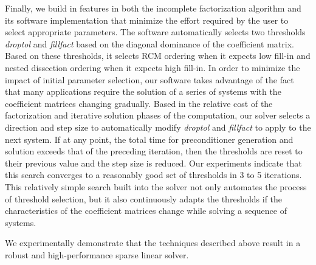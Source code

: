 \documentclass{report}
\begin{document}
Finally, we build in features in both the incomplete factorization
algorithm and its software implementation that minimize the effort
required by the user to select appropriate parameters. The software
automatically selects two thresholds {\em droptol} and {\em fillfact}
based on the diagonal dominance of the coefficient matrix. Based on
these thresholds, it selects RCM ordering when it expects
low fill-in and nested dissection ordering when it
expects high fill-in. In order to minimize the impact of initial parameter
selection, our software takes
advantage of the fact that many applications require the solution of a
series of systems with the coefficient matrices changing gradually.
Based in the relative cost of the factorization and iterative solution
phases of the computation, our solver selects a direction and step size
to automatically modify {\em droptol} and {\em fillfact} to apply to
the next system. If at any point, the total time for preconditioner
generation and solution exceeds that of the preceding iteration, then
the thresholds are reset to their previous value and the step size is
reduced. Our experiments indicate that this search converges to
a reasonably good set of thresholds in 3 to 5 iterations. This relatively
simple search built into the solver not only automates the process
of threshold selection, but it also continuously adapts the thresholds
if the characteristics of the coefficient matrices change while
solving a sequence of systems.

We experimentally demonstrate that the techniques described above
result in a robust and high-performance sparse linear solver.
\end{document}

